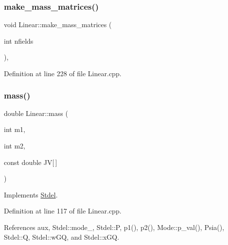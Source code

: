 \subsubsection{\texorpdfstring{make\+\_\+mass\+\_\+matrices()}{make\_mass\_matrices()}}
{\footnotesize\ttfamily void Linear\+::make\+\_\+mass\+\_\+matrices (\begin{DoxyParamCaption}\item[{int}]{nfields }\end{DoxyParamCaption})\hspace{0.3cm}{\ttfamily [private]}, {\ttfamily [virtual]}}



Definition at line 228 of file Linear.\+cpp.

\mbox{\label{classLinear_aed8640c00d187985b5303c257323ed91}} 
\subsubsection{\texorpdfstring{mass()}{mass()}}
{\footnotesize\ttfamily double Linear\+::mass (\begin{DoxyParamCaption}\item[{int}]{m1,  }\item[{int}]{m2,  }\item[{const double}]{JV\mbox{[}$\,$\mbox{]} }\end{DoxyParamCaption})\hspace{0.3cm}{\ttfamily [virtual]}}



Implements \hyperlink{classStdel_ab475cc8bc82a3b8a5200d4d841ef0a51}{Stdel}.



Definition at line 117 of file Linear.\+cpp.



References aux, Stdel\+::mode\+\_\+, Stdel\+::P, p1(), p2(), Mode\+::p\+\_\+val(), Psia(), Stdel\+::Q, Stdel\+::w\+GQ, and Stdel\+::x\+GQ.

